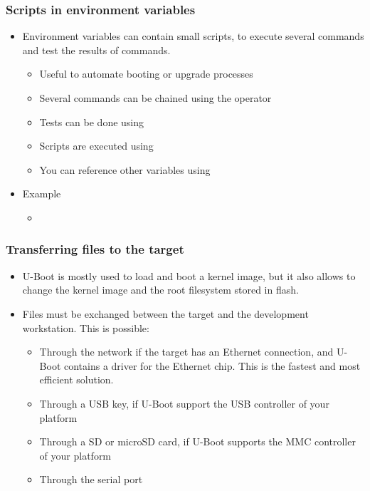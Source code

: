 \begin{frame}
  \frametitle{Scripts in environment variables}
  \begin{itemize}
  \item Environment variables can contain small scripts, to execute
    several commands and test the results of commands.
    \begin{itemize}
    \item Useful to automate booting or upgrade processes
    \item Several commands can be chained using the \code{;} operator
    \item Tests can be done using
    \item Scripts are executed using 
    \item You can reference other variables using
    \end{itemize}
  \item Example
    \begin{itemize}
    \item {}
  \end{itemize}
\end{itemize}
\end{frame}

\begin{frame}
  \frametitle{Transferring files to the target}
  \begin{itemize}
  \item U-Boot is mostly used to load and boot a kernel image, but it
    also allows to change the kernel image and the root filesystem
    stored in flash.
  \item Files must be exchanged between the target and the development
    workstation. This is possible:
    \begin{itemize}
    \item Through the network if the target has an Ethernet
      connection, and U-Boot contains a driver for the Ethernet
      chip. This is the fastest and most efficient solution.
    \item Through a USB key, if U-Boot support the USB controller of
      your platform
    \item Through a SD or microSD card, if U-Boot supports the MMC
      controller of your platform
    \item Through the serial port
    \end{itemize}
  \end{itemize}
\end{frame}

